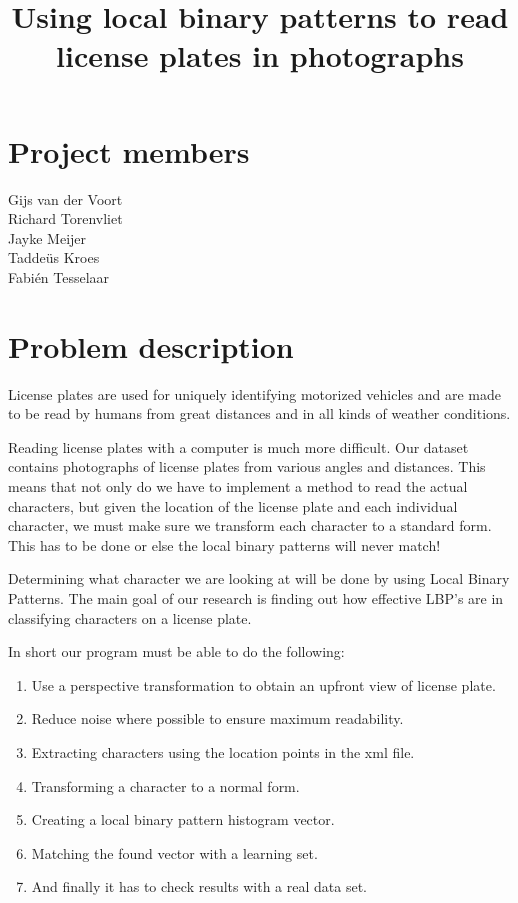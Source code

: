 \documentclass[a4paper]{article}
\title{Using local binary patterns to read license plates in photographs}
\begin{document}
\maketitle

\section*{Project members}
Gijs van der Voort\\
Richard Torenvliet\\
Jayke Meijer\\
Tadde\"us Kroes\\
Fabi\'en Tesselaar

\tableofcontents
\pagebreak

\setcounter{secnumdepth}{1}

\section{Problem description}

License plates are used for uniquely identifying motorized vehicles and are
made to be read by humans from great distances and in all kinds of weather
conditions.

Reading license plates with a computer is much more difficult. Our dataset
contains photographs of license plates from various angles and distances. This
means that not only do we have to implement a method to read the actual
characters, but given the location of the license plate and each individual
character, we must make sure we transform each character to a standard form. 
This has to be done or else the local binary patterns will never match!

Determining what character we are looking at will be done by using Local Binary
Patterns. The main goal of our research is finding out how effective LBP's are
in classifying characters on a license plate.

In short our program must be able to do the following:

\begin{enumerate}
    \item Use a perspective transformation to obtain an upfront view of license
          plate.
    \item Reduce noise where possible to ensure maximum readability.
    \item Extracting characters using the location points in the xml file.
    \item Transforming a character to a normal form.
    \item Creating a local binary pattern histogram vector.
    \item Matching the found vector with a learning set.
    \item And finally it has to check results with a real data set.
\end{enumerate}
\end{document}
